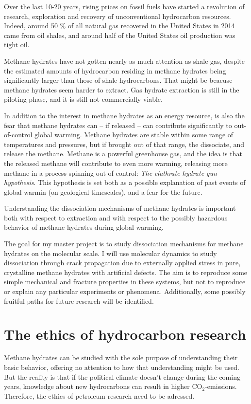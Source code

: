 Over the last 10-20 years, rising prices on fossil fuels have started a revolution of research, exploration and recovery of unconventional hydrocarbon resources. Indeed, around 50 \% of all natural gas recovered in the United States in 2014 came from oil shales, and around half of the United States oil production was tight oil.

Methane hydrates have not gotten nearly as much attention as shale gas, despite the estimated amounts of hydrocarbon residing in methane hydrates being significantly larger than those of shale hydrocarbons. That might be beacuse methane hydrates seem harder to extract. Gas hydrate extraction is still in the piloting phase, and it is still not commercially viable.

In addition to the interest in methane hydrates as an energy resource, is also the fear that methane hydrates can -- if released -- can contribute significantly to out-of-control global warming. Methane hydrates are stable within some range of temperatures and pressures, but if brought out of that range, the dissociate, and release the methane. Methane is a powerful greenhouse gas, and the idea is that the released methane will contribute to even more warming, releasing more methane in a process spinning out of control: \emph{The clathrate hydrate gun hypothesis}. This hypothesis is set both as a possible explanation of past events of global warmin (on geological timescales), and a fear for the future.

Understanding the dissociation mechanisms of methane hydrates is important both with respect to extraction and with respect to the possibly hazardous behavior of methane hydrates during global warming. 

The goal for my master project is to study dissociation mechanisms for methane hydrates on the molecular scale. I will use molecular dynamics to study dissociation through crack propagation due to externally applied stress in pure, crystalline methane hydrates with artificial defects. The aim is to reproduce some simple mechanical and fracture properties in these systems, but not to reproduce or explain any particular experiments or phenomena. Additionally, some possibly fruitful paths for future research will be identified.

\section{The ethics of hydrocarbon research}
Methane hydrates can be studied with the sole purpose of understanding their basic behavior, offering no attention to how that understanding might be used. But the reality is that if the political climate doesn't change during the coming years, knowledge about new hydrocarbons can result in higher CO$_2$-emissions. Therefore, the ethics of petroleum research need to be adressed.

